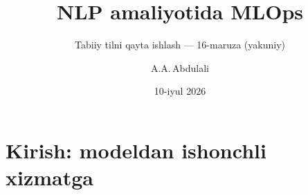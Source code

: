 \documentclass[aspectratio=169,11pt]{beamer}
\title[MLOps]{NLP amaliyotida MLOps}
\subtitle{Tabiiy tilni qayta ishlash --- 16-ma\uzq{}ruza (yakuniy)}
\author[A.A.\,Abdulali]{A.A.\,Abdulali}
\date{10-iyul 2026}
\institute{11:30--12:50 \quad$\cdot$\quad mavzu \textnumero{}16}
\begin{document}

\maketitle

\section[Kirish]{Kirish: modeldan ishonchli xizmatga}

\end{document}
